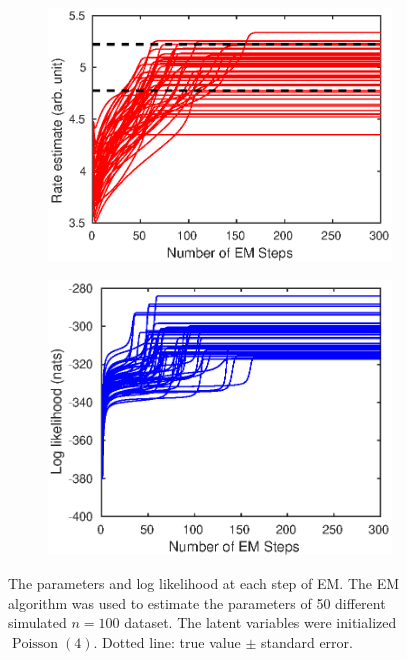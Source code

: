 \documentclass[12pt]{report}
\DeclareMathOperator{\poisson}{Poisson}
\begin{document}
\begin{figure}
\begin{subfigure}{0.45\textwidth}
		\includegraphics[width=\textwidth]{figures/hierarchicalModel/EM_repeat_rate.eps}
	\end{subfigure}
	\begin{subfigure}{0.45\textwidth}
		\includegraphics[width=\textwidth]{figures/hierarchicalModel/EM_repeat_lnL.eps}
	\end{subfigure}
	\caption{The parameters and log likelihood at each step of EM. The EM algorithm was used to estimate the parameters of 50 different simulated $n=100$ dataset. The latent variables were initialized $\poisson(4)$. Dotted line: true value $\pm$ standard error.}
	\label{fig:compoundPoisson_multipleDatasets}
\end{figure}
\end{document}
